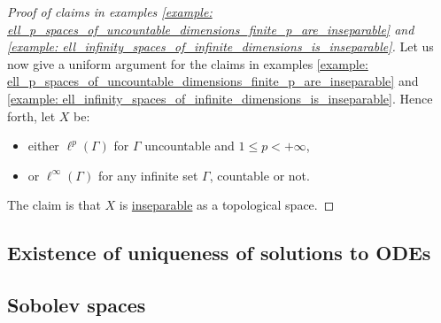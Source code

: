         \begin{proof}[Proof of claims in examples \ref{example: ell_p_spaces_of_uncountable_dimensions_finite_p_are_inseparable} and \ref{example: ell_infinity_spaces_of_infinite_dimensions_is_inseparable}]
            Let us now give a uniform argument for the claims in examples \ref{example: ell_p_spaces_of_uncountable_dimensions_finite_p_are_inseparable} and \ref{example: ell_infinity_spaces_of_infinite_dimensions_is_inseparable}. Hence forth, let $X$ be:
            \begin{itemize}
                \item either $\ell^p(\Gamma)$ for $\Gamma$ uncountable and $1 \leq p < +\infty$,
                \item or $\ell^{\infty}(\Gamma)$ for any infinite set $\Gamma$, countable or not.
            \end{itemize}
            The claim is that $X$ is \underline{inseparable} as a topological space.

        \end{proof}

    \subsection{Existence of uniqueness of solutions to ODEs}

    \subsection{Sobolev spaces} \label{subsection: sobolev_spaces}